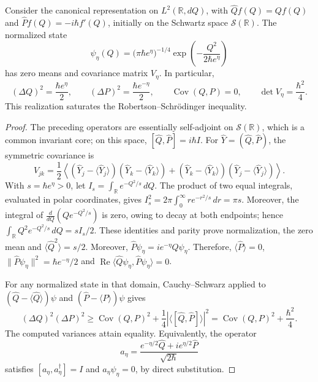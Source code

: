 \begin{proposition}
\label{ii:prop:ii-covarianza-gaussiana}
Consider the canonical representation on \(L^2(\mathbb R,dQ)\), with
\(\widehat Qf(Q)=Qf(Q)\) and
\(\widehat Pf(Q)=-i\hbar f'(Q)\), initially on the Schwartz
space \(\mathcal S(\mathbb R)\). The normalized state
\begin{equation}
 \psi_\eta(Q)=\bigl(\pi\hbar e^\eta\bigr)^{-1/4}
 \exp\!\left(-\frac{Q^2}{2\hbar e^\eta}\right)
 \label{ii:eq:ii-gaussiana-accion}
\end{equation}
has zero means and covariance matrix \(V_\eta\). In particular,
\begin{equation}
 (\Delta Q)^2=\frac{\hbar e^\eta}{2},\qquad
 (\Delta P)^2=\frac{\hbar e^{-\eta}}{2},\qquad
 \operatorname{Cov}(Q,P)=0,\qquad
 \det V_\eta=\frac{\hbar^2}{4}.
 \label{ii:eq:ii-varianzas-accion}
\end{equation}
This realization saturates the Robertson--Schrödinger inequality.
\end{proposition}

\begin{proof}
The preceding operators are essentially self-adjoint on
\(\mathcal S(\mathbb R)\), which is a common invariant core;
on this space,
\([\widehat Q,\widehat P]=i\hbar I\). For
\(\widehat Y=(\widehat Q,\widehat P)\), the symmetric covariance is
\[
 V_{jk}=\frac12\left\langle
 (\widehat Y_j-\langle\widehat Y_j\rangle)
 (\widehat Y_k-\langle\widehat Y_k\rangle)
 +(\widehat Y_k-\langle\widehat Y_k\rangle)
 (\widehat Y_j-\langle\widehat Y_j\rangle)
 \right\rangle.
\]
With \(s=\hbar e^\eta>0\), let \(I_s=\int_{\mathbb R}e^{-Q^2/s}\,dQ\). The product of two equal integrals, evaluated in polar coordinates, gives \(I_s^2=2\pi\int_0^\infty r e^{-r^2/s}\,dr=\pi s\). Moreover, the integral of \(\frac{d}{dQ}(Qe^{-Q^2/s})\) is zero, owing to decay at both endpoints; hence \(\int_{\mathbb R}Q^2e^{-Q^2/s}\,dQ=sI_s/2\). These identities and parity prove normalization, the zero mean and \(\langle\widehat Q^2\rangle=s/2\). Moreover, \(\widehat P\psi_\eta=i e^{-\eta}Q\psi_\eta\). Therefore, \(\langle\widehat P\rangle=0\), \(\|\widehat P\psi_\eta\|^2=\hbar e^{-\eta}/2\) and \(\operatorname{Re}\langle\widehat Q\psi_\eta,
\widehat P\psi_\eta\rangle=0\).

For any normalized state in that domain, Cauchy--Schwarz applied
to \((\widehat Q-\langle\widehat Q\rangle)\psi\) and
\((\widehat P-\langle\widehat P\rangle)\psi\) gives
\[
 (\Delta Q)^2(\Delta P)^2
 \geq \operatorname{Cov}(Q,P)^2
       +\frac14\left|\langle[\widehat Q,\widehat P]\rangle\right|^2
 =\operatorname{Cov}(Q,P)^2+\frac{\hbar^2}{4}.
\]
The computed variances attain equality. Equivalently, the
operator
\[
 a_\eta=\frac{e^{-\eta/2}\widehat Q
                  +i e^{\eta/2}\widehat P}{\sqrt{2\hbar}}
\]
satisfies \([a_\eta,a_\eta^\dagger]=I\) and
\(a_\eta\psi_\eta=0\), by direct substitution.
\end{proof}

